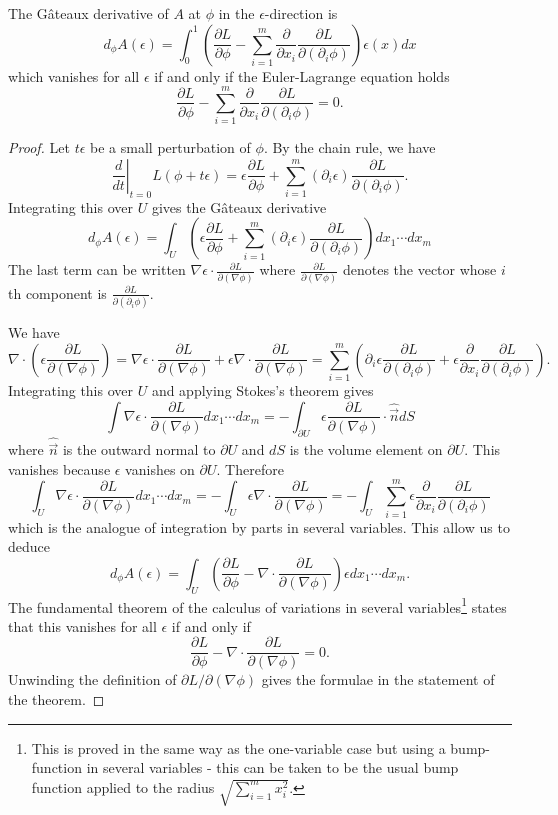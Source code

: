 \begin{thm}
The G\^{a}teaux derivative of $A$ at $\phi$ in the $\epsilon$-direction is
\[d_{\phi}A(\epsilon)=\int_0^1\left(\frac{\partial L}{\partial \phi}-\sum_{i=1}^m\frac{\partial}{\partial x_i}\frac{\partial L}{\partial(\partial_i\phi)}\right)\epsilon(x)dx\]
which vanishes for all $\epsilon$ if and only if the Euler-Lagrange equation holds
\[\frac{\partial L}{\partial\phi}-\sum_{i=1}^m\frac{\partial}{\partial x_i}\frac{\partial L}{\partial (\partial_i\phi)}=0.\]
\end{thm}
\begin{proof}
Let $t\epsilon$ be a small perturbation of $\phi$. By the chain rule, we have
\[\left.\frac{d}{dt}\right|_{t=0}L(\phi+t\epsilon)=\epsilon\frac{\partial L}{\partial\phi}+\sum_{i=1}^m(\partial_i\epsilon)\frac{\partial L}{\partial(\partial_i\phi)}.\]
Integrating this over $U$ gives the G\^{a}teaux derivative
\[d_{\phi}A(\epsilon)=\int_U\left(\epsilon\frac{\partial L}{\partial\phi}+\sum_{i=1}^m(\partial_i\epsilon)\frac{\partial L}{\partial(\partial_i\phi)}\right)dx_1\cdots dx_m\]
The last term can be written $\nabla\epsilon\cdot\frac{\partial L}{\partial(\nabla\phi)}$ where $\frac{\partial L}{\partial(\nabla\phi)}$ denotes the vector whose $i$th component is $\frac{\partial L}{\partial(\partial_i\phi)}$.

We have
\[\nabla\cdot\left(\epsilon\frac{\partial L}{\partial(\nabla\phi)}\right)=\nabla\epsilon\cdot\frac{\partial L}{\partial(\nabla\phi)}+\epsilon\nabla\cdot\frac{\partial L}{\partial(\nabla\phi)}=\sum_{i=1}^m\left(\partial_i\epsilon\frac{\partial L}{\partial(\partial_i\phi)}+\epsilon\frac{\partial}{\partial x_i}\frac{\partial L}{\partial(\partial_i\phi)}\right).\]
Integrating this over $U$ and applying Stokes's theorem gives
\[\int\nabla\epsilon\cdot\frac{\partial L}{\partial(\nabla\phi)}dx_1\cdots dx_m=-\int_{\partial U}\epsilon\frac{\partial L}{\partial(\nabla\phi)}\cdot\hat{\vec{n}}dS\]
where $\hat{\vec{n}}$ is the outward normal to $\partial U$ and $dS$ is the volume element on $\partial U$. This vanishes because $\epsilon$ vanishes on $\partial U$. Therefore
\[\int_U\nabla\epsilon\cdot\frac{\partial L}{\partial(\nabla\phi)}dx_1\cdots dx_m=-\int_U\epsilon\nabla\cdot\frac{\partial L}{\partial(\nabla\phi)}=-\int_U\sum_{i=1}^m\epsilon\frac{\partial}{\partial x_i}\frac{\partial L}{\partial(\partial_i\phi)}\]
which is the analogue of integration by parts in several variables. This allow us to deduce
\[d_{\phi}A(\epsilon)=\int_U\left(\frac{\partial L}{\partial\phi}-\nabla\cdot\frac{\partial L}{\partial(\nabla\phi)}\right)\epsilon dx_1\cdots dx_m.\]
The fundamental theorem of the calculus of variations in several variables\footnote{This is proved in the same way as the one-variable case but using a bump-function in several variables - this can be taken to be the usual bump function applied to the radius $\sqrt{\sum_{i=1}^mx_i^2}$.} states that this vanishes for all $\epsilon$ if and only if
\[\frac{\partial L}{\partial\phi}-\nabla\cdot\frac{\partial L}{\partial(\nabla\phi)}=0.\]
Unwinding the definition of $\partial L/\partial(\nabla\phi)$ gives the formulae in the statement of the theorem.
\end{proof}
